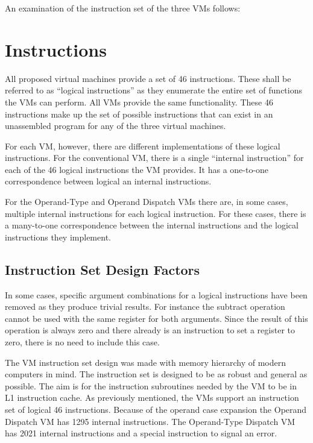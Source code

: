 \documentclass[english,a4paper,12pt]{report}
\begin{document}
An examination of the instruction set of the three VMs follows:

\section{Instructions}

All proposed virtual machines provide a set of 46 instructions. These
shall be referred to as ``logical instructions'' as they enumerate the
entire set of functions the VMs can perform. All VMs provide the same
functionality. These 46 instructions make up the set of possible
instructions that can exist in an unassembled program for any of the
three virtual machines. 

For each VM, however, there are different implementations of these
logical instructions. For the conventional VM, there is a single
``internal instruction'' for each of the 46 logical instructions the
VM provides. It has a one-to-one correspondence between logical an
internal instructions. 

For the Operand-Type and Operand Dispatch VMs there are, in some
cases, multiple internal instructions for each logical
instruction. For these cases, there is a many-to-one correspondence
between the internal instructions and the logical instructions they
implement.

\subsection{Instruction Set Design Factors}
\label{sec:inst-set-design-factors}
In some cases, specific argument combinations for a logical
instructions have been removed as they produce trivial results. For
instance the subtract operation cannot be used with the same register
for both arguments. Since the result of this operation is always zero
and there already is an instruction to set a register to zero, there
is no need to include this case.

The VM instruction set design was made with memory hierarchy of modern
computers in mind. The instruction set is designed to be as robust and
general as possible. The aim is for the instruction subroutines needed
by the VM to be in L1 instruction cache. As previously mentioned, the
VMs support an instruction set of logical 46 instructions. Because of
the operand case expansion the Operand Dispatch VM has 1295 internal
instructions. The Operand-Type Dispatch VM has 2021 internal
instructions and a special instruction to signal an error.
\end{document}

